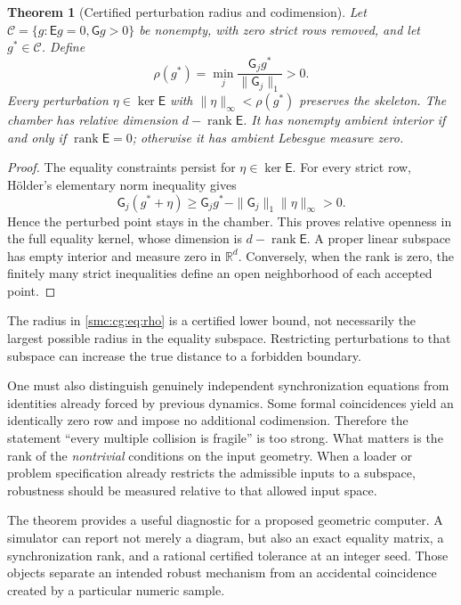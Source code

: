 \documentclass[11pt,letterpaper]{article}
\numberwithin{equation}{section}
\newtheorem{theorem}{Theorem}[section]
\theoremstyle{definition}
\theoremstyle{remark}
\newcommand{\R}{\mathbb R}
\newcommand{\Ccal}{\mathcal C}
\newcommand{\rank}{\operatorname{rank}}
\begin{document}
\begin{theorem}[Certified perturbation radius and codimension]
\label{smc:cg:thm:robust}
Let $\Ccal=\{g:\mathsf E g=0,\mathsf Gg>0\}$ be nonempty, with zero strict
rows removed, and let $g^*\in\Ccal$. Define
\begin{equation}
 \rho(g^*)=\min_j\frac{\mathsf G_jg^*}{\|\mathsf G_j\|_1}>0.
 \label{smc:cg:eq:rho}
\end{equation}
Every perturbation $\eta\in\ker\mathsf E$ with
$\|\eta\|_\infty<\rho(g^*)$ preserves the skeleton. The chamber has relative
dimension $d-\rank\mathsf E$. It has nonempty ambient interior if and only
if $\rank\mathsf E=0$; otherwise it has ambient Lebesgue measure zero.
\end{theorem}
\begin{proof}
The equality constraints persist for $\eta\in\ker\mathsf E$. For every
strict row, H\"older's elementary norm inequality gives
\[
 \mathsf G_j(g^*+\eta)
 \ge \mathsf G_jg^*-\|\mathsf G_j\|_1\|\eta\|_\infty>0.
\]
Hence the perturbed point stays in the chamber. This proves relative
openness in the full equality kernel, whose dimension is
$d-\rank\mathsf E$. A proper linear subspace has empty interior and measure
zero in $\R^d$. Conversely, when the rank is zero, the finitely many strict
inequalities define an open neighborhood of each accepted point.
\end{proof}

The radius in \eqref{smc:cg:eq:rho} is a certified lower bound, not necessarily the
largest possible radius in the equality subspace. Restricting perturbations
to that subspace can increase the true distance to a forbidden boundary.

One must also distinguish genuinely independent synchronization equations
from identities already forced by previous dynamics. Some formal
coincidences yield an identically zero row and impose no additional
codimension. Therefore the statement ``every multiple collision is fragile''
is too strong. What matters is the rank of the \emph{nontrivial} conditions
on the input geometry. When a loader or problem specification already
restricts the admissible inputs to a subspace, robustness should be measured
relative to that allowed input space.

The theorem provides a useful diagnostic for a proposed geometric computer.
A simulator can report not merely a diagram, but also an exact equality
matrix, a synchronization rank, and a rational certified tolerance at an
integer seed. Those objects separate an intended robust mechanism from an
accidental coincidence created by a particular numeric sample.
\end{document}
